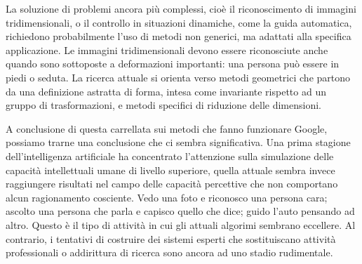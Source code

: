 \documentclass[xcolor=svgnames]{beamer}
\begin{document}
\begin{frame}
\begin{itemize}
La soluzione di problemi ancora più complessi, cioè il riconoscimento di immagini tridimensionali, o il controllo in situazioni dinamiche, come la guida automatica, richiedono probabilmente l'uso di metodi non generici, ma adattati alla specifica applicazione. Le immagini tridimensionali devono essere riconosciute anche quando sono sottoposte a deformazioni importanti: una persona può essere in piedi o seduta. La ricerca attuale si orienta verso metodi geometrici che partono da una definizione astratta di forma, intesa come invariante rispetto ad un gruppo di trasformazioni, e metodi specifici di riduzione delle dimensioni.

A conclusione di questa carrellata sui metodi che fanno funzionare Google, possiamo trarne una conclusione che ci sembra significativa. Una prima stagione dell'intelligenza artificiale ha concentrato l'attenzione sulla simulazione delle capacità intellettuali umane di livello superiore, quella attuale sembra invece raggiungere risultati nel campo delle capacità percettive che non comportano alcun ragionamento cosciente. Vedo una foto e riconosco una persona cara; ascolto una persona che parla e capisco quello che dice; guido l'auto pensando ad altro. Questo è il tipo di attività in cui gli attuali algorimi sembrano eccellere. Al contrario, i tentativi di costruire dei sistemi esperti che sostituiscano attività professionali o addirittura di ricerca sono ancora ad uno stadio rudimentale.
\end{itemize}

\end{frame}
\end{document}
